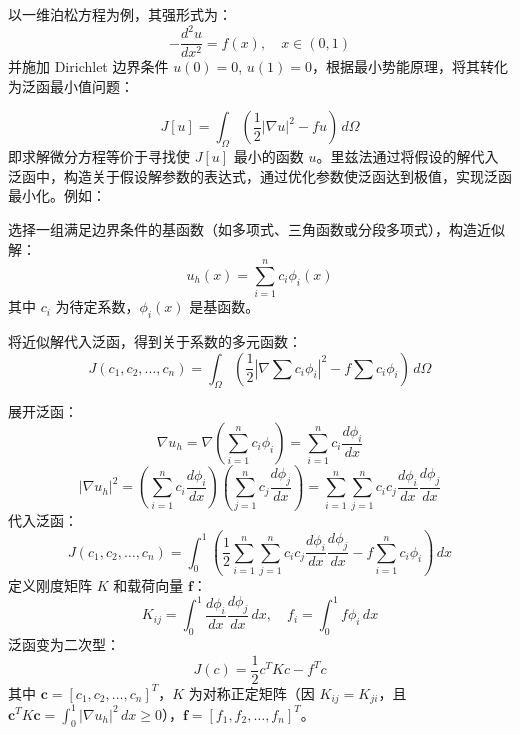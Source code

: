 \documentclass[engineeringmaster]{hquThesis}
\begin{document}
以一维泊松方程为例，其强形式为：
\begin{equation}
    -\frac{d^2 u}{dx^2} = f(x), \quad x \in (0, 1)
    \label{eq:poisson_strong}
\end{equation}
并施加 Dirichlet 边界条件 \( u(0) = 0 \), \( u(1) = 0 \)，根据最小势能原理，将其转化为泛函最小值问题：


\begin{equation}
    J[u] = \int_{\Omega} \left( \frac{1}{2} |\nabla u|^2 - f u \right) \, d\Omega
    \label{eq:energy_functional}
    \end{equation}
即求解微分方程等价于寻找使 \( J[u] \) 最小的函数 \( u \)。里兹法通过将假设的解代入泛函中，构造关于假设解参数的表达式，通过优化参数使泛函达到极值，实现泛函最小化。例如：



选择一组满足边界条件的基函数（如多项式、三角函数或分段多项式），构造近似解：
\begin{equation}
    u_h(x) = \sum_{i=1}^n c_i \phi_i(x)
    \label{eq:approx_solution}
    \end{equation}
其中 \( c_i \) 为待定系数，\( \phi_i(x) \) 是基函数。

将近似解代入泛函，得到关于系数的多元函数：
\begin{equation}
    J(c_1, c_2, \dots, c_n) = \int_{\Omega} \left( \frac{1}{2} \left| \nabla \sum c_i \phi_i \right|^2 - f \sum c_i \phi_i \right) \, d\Omega
    \label{eq:functional_coeffs}
\end{equation}

    展开泛函：
    \[
    \nabla u_h = \nabla \left( \sum_{i=1}^n c_i \phi_i \right) = \sum_{i=1}^n c_i \frac{d \phi_i}{dx}
    \]
    \[
    \left| \nabla u_h \right|^2 = \left( \sum_{i=1}^n c_i \frac{d \phi_i}{dx} \right) \left( \sum_{j=1}^n c_j \frac{d \phi_j}{dx} \right) = \sum_{i=1}^n \sum_{j=1}^n c_i c_j \frac{d \phi_i}{dx} \frac{d \phi_j}{dx}
    \]
    代入泛函：
    \[
    J(c_1, c_2, \dots, c_n) = \int_0^1 \left( \frac{1}{2} \sum_{i=1}^n \sum_{j=1}^n c_i c_j \frac{d \phi_i}{dx} \frac{d \phi_j}{dx} - f \sum_{i=1}^n c_i \phi_i \right) \, dx
    \]
    定义刚度矩阵 \( K \) 和载荷向量 \( \mathbf{f} \)：
    \[
    K_{ij} = \int_0^1 \frac{d \phi_i}{dx} \frac{d \phi_j}{dx} \, dx, \quad f_i = \int_0^1 f \phi_i \, dx
    \]
泛函变为二次型：
\begin{equation}
    J(c) = \frac{1}{2} c^T K c - f^T c
    \label{eq:quadratic_form}
\end{equation}
其中 \( \mathbf{c} = [c_1, c_2, \dots, c_n]^T \)，\( K \) 为对称正定矩阵（因 \( K_{ij} = K_{ji} \)，且 \( \mathbf{c}^T K \mathbf{c} = \int_0^1 \left| \nabla u_h \right|^2 \, dx \geq 0 \)），\( \mathbf{f} = [f_1, f_2, \dots, f_n]^T \)。
\end{document}
